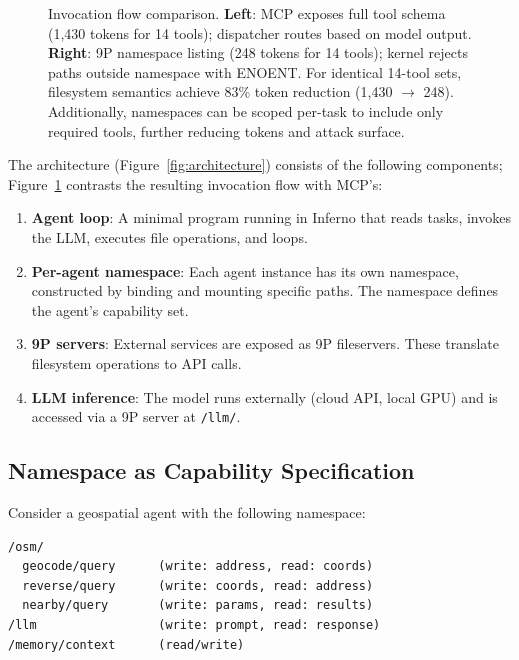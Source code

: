 \documentclass{article}
\begin{document}
\begin{figure}[t]
\caption{Invocation flow comparison. \textbf{Left}: MCP exposes full tool schema (1,430 tokens for 14 tools); dispatcher routes based on model output. \textbf{Right}: 9P namespace listing (248 tokens for 14 tools); kernel rejects paths outside namespace with ENOENT. For identical 14-tool sets, filesystem semantics achieve 83\% token reduction (1,430 $\rightarrow$ 248). Additionally, namespaces can be scoped per-task to include only required tools, further reducing tokens and attack surface.}
\label{fig:invocation-comparison}
\end{figure}

The architecture (Figure~\ref{fig:architecture}) consists of the following components; Figure~\ref{fig:invocation-comparison} contrasts the resulting invocation flow with MCP's:

\begin{enumerate}
    \item \textbf{Agent loop}: A minimal program running in Inferno that reads tasks, invokes the LLM, executes file operations, and loops.

    \item \textbf{Per-agent namespace}: Each agent instance has its own namespace, constructed by binding and mounting specific paths. The namespace defines the agent's capability set.

    \item \textbf{9P servers}: External services are exposed as 9P fileservers. These translate filesystem operations to API calls.

    \item \textbf{LLM inference}: The model runs externally (cloud API, local GPU) and is accessed via a 9P server at \texttt{/llm/}.
\end{enumerate}

\subsection{Namespace as Capability Specification}

Consider a geospatial agent with the following namespace:

\begin{lstlisting}[caption={Example agent namespace}]
/osm/
  geocode/query      (write: address, read: coords)
  reverse/query      (write: coords, read: address)
  nearby/query       (write: params, read: results)
/llm                 (write: prompt, read: response)
/memory/context      (read/write)
\end{lstlisting}
\end{document}
